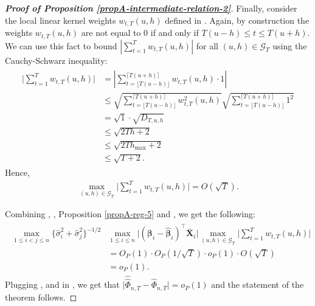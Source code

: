 \documentclass[a4paper,12pt]{article}
\makeatletter
\renewcommand{\eqref}[1]{\tagform@{\ref{#1}}}
\newcommand{\doublehattwo}[1]{\widehat{\widehat{#1}}}
\makeatother
\begin{document}
\begin{proof}[\textnormal{\textbf{Proof of Proposition \ref{propA-intermediate-relation-2}}}]
Finally, consider the local linear kernel weights $w_{t,T}(u,h)$ defined in \eqref{eq:weights}. Again, by construction the weights $w_{t, T}(u, h)$ are not equal to $0$ if and only if \linebreak $T(u-h) \le t \le T(u+h)$. We can use this fact to bound  $\left| \sum_{t=1}^T w_{t,T}(u,h)  \right|$ for all $(u, h) \in \mathcal{G}_T$ using the Cauchy-Schwarz inequality:
\begin{align}\label{weights-cauchy-schwarz}
\begin{split}
\Big| \sum_{t=1}^T w_{t,T}(u,h)   \Big| & = \left| \sum_{t=\lfloor T(u-h) \rfloor}^{\lceil T(u+h) \rceil} w_{t,T}(u,h) \cdot 1  \right|  \\
&\leq \sqrt{\sum_{t=\lfloor T(u-h) \rfloor}^{\lceil T(u+h) \rceil} w^2_{t,T}(u,h)}\sqrt{\sum_{t=\lfloor T(u-h) \rfloor}^{\lceil T(u+h) \rceil} 1^2}\\
&=\sqrt{1}\cdot\sqrt{D_{T, u, h}} \\
&  \leq \sqrt{2Th + 2} \\
&\leq \sqrt{2Th_{\max} +2} \\
&\leq\sqrt{T+2}.
\end{split}
\end{align}
Hence, 
\begin{align}\label{ineq-diff-13}
\max_{(u,h) \in \mathcal{G}_T}  \Big| \sum_{t=1}^T w_{t,T}(u,h)  \Big| = O(\sqrt{T}).
\end{align}

Combining \eqref{ineq-diff-11}, \eqref{ineq-diff-12}, Proposition \ref{propA-reg-5} and \eqref{ineq-diff-13}, we get the following:
\begin{align}\label{ineq-diff-14}
\begin{split}
\max_{1\le i < j \le n} \{\widehat{\sigma}_i^2+ \widehat{\sigma}_j^2 \}^{-1/2}&\max_{1\le i  \le n}\big|(\bm{\beta}_i - \widehat{\bm{\beta}}_i)^\top\bar{\mathbf{X}}_{i}\big| \max_{(u,h) \in \mathcal{G}_T}  \Big| \sum_{t=1}^T w_{t,T}(u,h)  \Big|   \\
&=O_P(1) \cdot O_P(1/\sqrt{T}) \cdot o_P(1) \cdot O(\sqrt{T})\\
& = o_P(1).
\end{split}
\end{align}
Plugging \eqref{ineq-diff-5}, \eqref{ineq-diff-10} and \eqref{ineq-diff-14} in \eqref{ineq-diff-1}, we get that $\big|\doublehattwo{\Phi}_{n,T} - \widehat{\Phi}_{n,T}\big| = o_P(1)$ and the statement of the theorem follows.
\end{proof}
\end{document}
